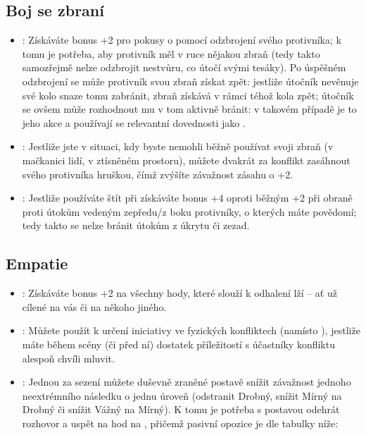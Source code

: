\documentclass[../main.tex]{subfiles}
\begin{document}
\subsection{Boj se zbraní}
\label{sec:trik-bsz}
\begin{itemize}
\item{}:
  Získáváte bonus +2 pro pokusy o  pomocí odzbrojení svého protivníka; k tomu je potřeba, aby protivník měl v ruce nějakou zbraň (tedy takto samozřejmě nelze odzbrojit nestvůru, co útočí svými tesáky). Po úspěšném odzbrojení se může protivník svou zbraň získat zpět: jestliže útočník nevěnuje své kolo snaze tomu zabránit, zbraň získává v rámci téhož kola zpět; útočník se ovšem může rozhodnout mu v tom aktivně bránit: v takovém případě je to jeho akce a používají se relevantní dovednosti jako .

\item{}:
\label{sec:bsz-hruska}
Jestliže jste v situaci, kdy byste nemohli běžně používat svoji zbraň (v mačkanici lidí, v ztísněném prostoru), můžete dvakrát za konflikt zasáhnout svého protivníka hruškou, čímž zvýšíte závažnost zásahu o +2.

\item{}:
  \label{sec:bsz-stitar}
Jestliže používáte štít při  získáváte bonus +4 oproti běžným +2 při obraně proti útokům vedeným zepředu/z boku protivníky, o kterých máte povědomí; tedy takto se nelze bránit útokům z úkrytu či zezad. 
\end{itemize}



\subsection{Empatie}
\label{sec:trik-empatie}

\begin{itemize}
\item{}:
\label{sec:empatie-odhalovani} Získáváte bonus +2 na všechny hody, které slouží k odhalení lží – ať už cílené na vás či na někoho jiného.

\item{}:
\label{sec:empatie-cit} Můžete použít  k určení iniciativy ve fyzických konfliktech (namísto ), jestliže máte během scény (či před ní) dostatek příležitostí s účastníky konfliktu alespoň chvíli mluvit.

\item{}:
\label{sec:empatie-terapuet} Jednou za sezení můžete duševně zraněné postavě snížit závažnost jednoho neextrémního následku o jednu úroveň (odstranit Drobný, snížit Mírný na Drobný či snížit Vážný na Mírný). K tomu je potřeba s postavou odehrát rozhovor a uspět na hod na , přičemž pasivní opozice je dle tabulky níže:
\end{itemize}
\end{document}

